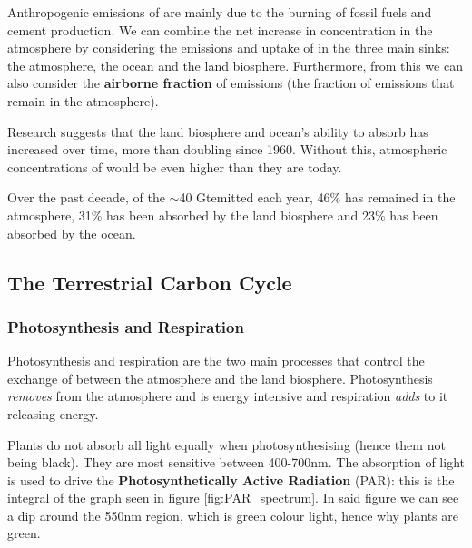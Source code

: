 Anthropogenic emissions of \COtwo are mainly due to the burning of fossil fuels and cement production. We can combine 
the net increase in \COtwo concentration in the atmosphere by considering the emissions and uptake of \COtwo in the 
three main sinks: the atmosphere, the ocean and the land biosphere. Furthermore, from this we can also consider the 
\textbf{airborne fraction} of \COtwo emissions (the fraction of emissions that remain in the atmosphere).

Research suggests that the land biosphere and ocean's ability to absorb \COtwo has increased over time, more than 
doubling since 1960. Without this, atmospheric concentrations of \COtwo would be even higher than they are today.

Over the past decade, of the $\sim$40 Gt\COtwo emitted each year, 46\% has remained in the atmosphere, 31\% has been
absorbed by the land biosphere and 23\% has been absorbed by the ocean.\\

\subsection{The Terrestrial Carbon Cycle}
\label{sec:terrestrial-carbon-cycle}

\subsubsection{Photosynthesis and Respiration}
\label{sec:photosynthesis_respiration}

Photosynthesis and respiration are the two main processes that control the exchange of \COtwo between the atmosphere and
the land biosphere. Photosynthesis \textit{removes} \COtwo from the atmosphere and is energy intensive and respiration
\textit{adds} \COtwo to it releasing energy.

Plants do not absorb all light equally when photosynthesising (hence them not being black). They are most sensitive
between 400-700nm. The absorption of light is used to drive the \textbf{Photosynthetically Active Radiation} (PAR): this
is the integral of the graph seen in figure \ref{fig:PAR_spectrum}. In said figure we can see a dip around the 550nm
region, which is green colour light, hence why plants are green. \\

